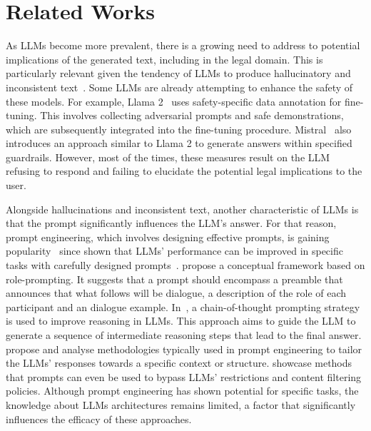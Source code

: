 \documentclass[sn-mathphys-num]{sn-jnl}%
\begin{document}
\section{Related Works}\label{sec:relatedwork}

As LLMs become more prevalent, there is a growing need to address to potential implications of the generated text, including in the legal domain. This is particularly relevant given the tendency of LLMs to produce hallucinatory and inconsistent text~\cite{ji2023survey}.
Some LLMs are already attempting to enhance the safety of these models. For example, Llama 2~\cite{touvron2023llama} uses safety-specific data annotation for fine-tuning. This involves collecting adversarial prompts and safe demonstrations, which are subsequently integrated into the fine-tuning procedure. Mistral~\cite{jiang2023mistral} also introduces an approach similar to Llama 2 to generate answers within specified guardrails. However, most of the times, these measures result on the LLM refusing to respond and failing to elucidate the potential legal implications to the user. 

Alongside hallucinations and inconsistent text, another characteristic of LLMs is that the prompt significantly influences the LLM's answer. 
For that reason, prompt engineering, which involves designing effective prompts, is gaining popularity~\cite{chen2023unleashing,10.1145/3597503.3608137} since shown that LLMs' performance can be improved in specific tasks with carefully designed prompts~\cite{brown2020language}. 
\cite{shanahan2023role} propose a conceptual framework based on role-prompting. It suggests that a prompt should encompass a preamble that announces that what follows will be dialogue, a description of the role of each participant and an dialogue example. In~\cite{wei2022chain}, a chain-of-thought prompting strategy is used to improve reasoning in LLMs. This approach aims to guide the LLM to generate a sequence of intermediate reasoning steps that lead to the final answer. \cite{white2023prompt,wang2023prompt} propose and analyse methodologies typically used in prompt engineering to tailor the LLMs' responses towards a specific context or structure. 
\cite{liu2024jailbreaking} showcase methods that prompts can even be used to bypass LLMs' restrictions and content filtering policies.
Although prompt engineering has shown potential for specific tasks, the knowledge about LLMs architectures remains limited, a factor that significantly influences the efficacy of these approaches. 
\end{document}
